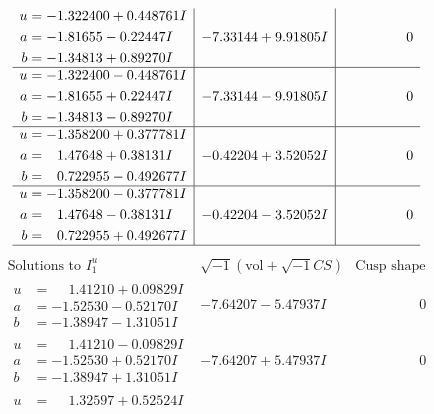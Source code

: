 \documentclass[1p]{elsarticle_modified}
\theoremstyle{definition}
\newcommand{\I}{\sqrt{-1}}
\begin{document}
$$\begin{array}{c|c|c}
\begin{aligned}
u &= -1.322400 + 0.448761 I \\
a &= -1.81655 - 0.22447 I \\
b &= -1.34813 + 0.89270 I\end{aligned}
 & -7.33144 + 9.91805 I & \phantom{-0.000000 } 0 \\ \hline\begin{aligned}
u &= -1.322400 - 0.448761 I \\
a &= -1.81655 + 0.22447 I \\
b &= -1.34813 - 0.89270 I\end{aligned}
 & -7.33144 - 9.91805 I & \phantom{-0.000000 } 0 \\ \hline\begin{aligned}
u &= -1.358200 + 0.377781 I \\
a &= \phantom{-}1.47648 + 0.38131 I \\
b &= \phantom{-}0.722955 - 0.492677 I\end{aligned}
 & -0.42204 + 3.52052 I & \phantom{-0.000000 } 0 \\ \hline\begin{aligned}
u &= -1.358200 - 0.377781 I \\
a &= \phantom{-}1.47648 - 0.38131 I \\
b &= \phantom{-}0.722955 + 0.492677 I\end{aligned}
 & -0.42204 - 3.52052 I & \phantom{-0.000000 } 0\\
 \hline 
 \end{array}$$\newpage$$\begin{array}{c|c|c}  
\text{Solutions to }I^u_{1}& \I (\text{vol} + \sqrt{-1}CS) & \text{Cusp shape}\\
 \hline 
\begin{aligned}
u &= \phantom{-}1.41210 + 0.09829 I \\
a &= -1.52530 - 0.52170 I \\
b &= -1.38947 - 1.31051 I\end{aligned}
 & -7.64207 - 5.47937 I & \phantom{-0.000000 } 0 \\ \hline\begin{aligned}
u &= \phantom{-}1.41210 - 0.09829 I \\
a &= -1.52530 + 0.52170 I \\
b &= -1.38947 + 1.31051 I\end{aligned}
 & -7.64207 + 5.47937 I & \phantom{-0.000000 } 0 \\ \hline\begin{aligned}
u &= \phantom{-}1.32597 + 0.52524 I \\

\end{aligned}
\end{array}$$
\end{document}
